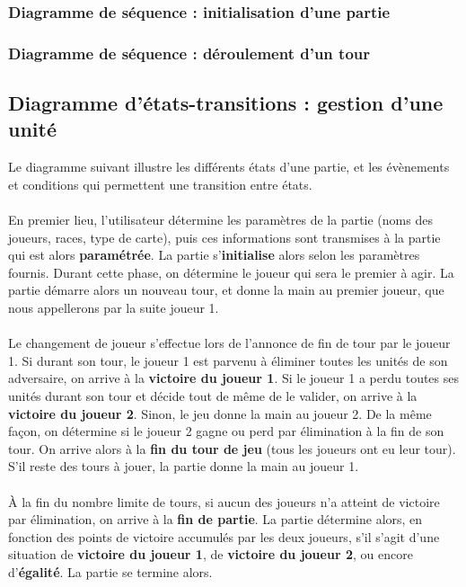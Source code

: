 \documentclass[a4paper]{article}
\begin{document}
\subsubsection{Diagramme de séquence : initialisation d'une partie}



\subsubsection{Diagramme de séquence : déroulement d'un tour}



\subsection{Diagramme d'états-transitions : gestion d'une unité}
Le diagramme suivant illustre les différents états d'une partie, et les évènements et conditions qui permettent une transition entre états.

\paragraph{}
En premier lieu, l'utilisateur détermine les paramètres de la partie (noms des joueurs, races, type de carte), puis ces informations sont transmises à la partie qui est alors \textbf{paramétrée}. La partie s'\textbf{initialise} alors selon les paramètres fournis. Durant cette phase, on détermine le joueur qui sera le premier à agir. La partie démarre alors un nouveau tour, et donne la main au premier joueur, que nous appellerons par la suite joueur 1.

\paragraph{}
Le changement de joueur s'effectue lors de l'annonce de fin de tour par le joueur 1. Si durant son tour, le joueur 1 est parvenu à éliminer toutes les unités de son adversaire, on arrive à la \textbf{victoire du joueur 1}. Si le joueur 1 a perdu toutes ses unités durant son tour et décide tout de même de le valider, on arrive à la \textbf{victoire du joueur 2}. Sinon, le jeu donne la main au joueur 2. De la même façon, on détermine si le joueur 2 gagne ou perd par élimination à la fin de son tour. On arrive alors à la \textbf{fin du tour de jeu} (tous les joueurs ont eu leur tour). S'il reste des tours à jouer, la partie donne la main au joueur 1.

\paragraph{}
À la fin du nombre limite de tours, si aucun des joueurs n'a atteint de victoire par élimination, on arrive à la \textbf{fin de partie}. La partie détermine alors, en fonction des points de victoire accumulés par les deux joueurs, s'il s'agit d'une situation de \textbf{victoire du joueur 1}, de \textbf{victoire du joueur 2}, ou encore d'\textbf{égalité}. La partie se termine alors.


\end{document}
